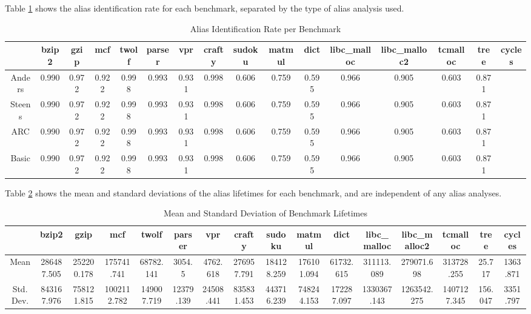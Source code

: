 Table \ref{table:4} shows the alias identification rate for each benchmark, separated by the type of alias analysis used.

\begin{table} [h!]
\centering
   \begin{tabular} {|c|c c c c c c c c c c c c c c c|}
      \hline
      & bzip2 & gzip & mcf & twolf & parser & vpr & crafty & sudoku & matmul & dict & libc\_malloc & libc\_malloc2 & tcmalloc & tree & cycles \\
      \hline
      Anders & 0.990 & 0.972 & 0.922 & 0.998 & 0.993 & 0.931 & 0.998 & 0.606 & 0.759 & 0.595 & 0.966 & 0.905 & 0.603 & 0.871 \\
      \hline
      Steens & 0.990 & 0.972 & 0.922 & 0.998 & 0.993 & 0.931 & 0.998 & 0.606 & 0.759 & 0.595 & 0.966 & 0.905 & 0.603 & 0.871 \\
      \hline
      ARC & 0.990 & 0.972 & 0.922 & 0.998 & 0.993 & 0.931 & 0.998 & 0.606 & 0.759 & 0.595 & 0.966 & 0.905 & 0.603 & 0.871 \\
      \hline
      Basic & 0.990 & 0.972 & 0.922 & 0.998 & 0.993 & 0.931 & 0.998 & 0.606 & 0.759 & 0.595 & 0.966 & 0.905 & 0.603 & 0.871 \\
      \hline
   \end{tabular}
   \caption{Alias Identification Rate per Benchmark}
   \label{table:4}
\end{table}

Table \ref{table:5} shows the mean and standard deviations of the alias lifetimes for each benchmark, and are independent of any alias analyses.

\begin{table} [h!]
\centering
   \begin{tabular} {|c|c c c c c c c c c c c c c c c|}
      \hline
      & bzip2 & gzip & mcf & twolf & parser & vpr & crafty & sudoku & matmul & dict & libc\_malloc & libc\_malloc2 & tcmalloc & tree & cycles \\
      \hline
      Mean & 286487.505 & 252200.178 & 175741.741 & 68782.141 & 3054.5 & 4762.618 & 276957.791 & 184128.259 & 176101.094 & 61732.615 & 311113.089 & 279071.698 & 313728.255 & 25.717 & 1363.871 \\
      \hline
      Std. Dev. & 843167.976 & 758121.815 & 1002112.782 & 149007.719 & 12379.139 & 24508.441 & 835831.453 & 443716.239 & 748244.153 & 172287.097 & 1330367.143 & 1263542.275 & 1407127.345 & 156.047 & 3351.797 \\
      \hline
   \end{tabular}
   \caption{Mean and Standard Deviation of Benchmark Lifetimes}
   \label{table:5}
\end{table}

